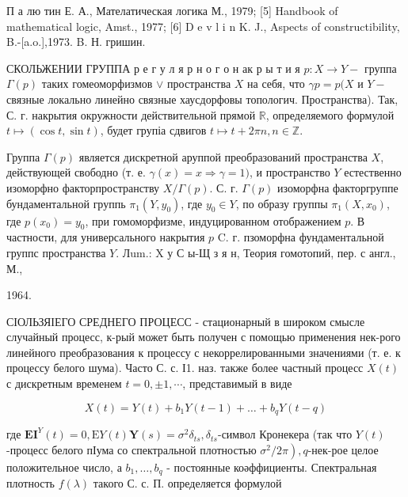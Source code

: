 \documentclass[10pt]{article}
\begin{document}
П а лю тин Е. А., Мателатическая логика М., 1979; [5] Handbook of mathematical logic, Amst., 1977; [6] D e v l i n K. J., Aspects of constructibility, B.-[a.o.],1973. B. Н. гришин.



СКОЛЬЖЕНИИ ГРУППА р е г у л я р н о г о н ак р ы т и я $p: X \rightarrow Y-$ группа $\Gamma(p)$ таких гомеоморфизмов $\vee$ пространства $X$ на себя, что $\gamma p=p(X$ и $Y-$ связные локально линейно связные хаусдорфовы топологич. Пространства). Так, С. г. накрытия окружности действительной прямой $\mathbb{R}$, определяемого формулой $t \mapsto(\cos t, \sin t)$, будет групіа сдвигов $t \mapsto t+2 \pi n, n \in \mathbb{Z}$.



Группа $\Gamma(p)$ является дискретной аруппой преобразований пространства $X$, действующей свободно (т. е. $\gamma(x)=x \Rightarrow \gamma=1)$, и пространство $Y$ естественно изоморфно факторпространству $X / \Gamma(p)$. С. г. $\Gamma(p)$ изоморфна факторгруппе бундаментальной группь $\pi_{1}\left(Y, y_{0}\right)$, где $y_{0} \in Y$, по образу группы $\pi_{1}\left(X, x_{0}\right)$, где $p\left(x_{0}\right)=y_{0}$, при гомоморфизме, индуцированном отображением $p$. В частности, для универсального накрытия $p$ C. г. пзоморфна фундаментальной группс пространства $Y$. Лum.: X у С ы-Щ з я н, Теория гомотопий, пер. с англ., М.,

1964.



СІОЛЬЗЯІЕГО СРЕДНЕГО ПРОЦЕСС - стационарный в широком смысле случайный процесс, к-рый может быть получен с помощью применения нек-рого линейного преобразования к процессу с некоррелированными значениями (т. е. к процессу белого шума). Часто С. с. І1. наз. также более частный процесс $X(t)$ с дискретным временем $t=0, \pm 1, \cdots$, представимый в виде



\[

X(t)=Y(t)+b_{1} Y(t-1)+\ldots+b_{q} Y(t-q)

\]



где $\boldsymbol{E I}^{Y}(t)=0, \mathrm{E} Y(t) \boldsymbol{Y}(s)=\sigma^{2} \delta_{t s}, \delta_{t s}$-символ Кронекера (так что $Y(t)$-процесс белого пІума со спектральной плотностью $\left.\sigma^{2} / 2 \pi\right), q$-нек-рое целое положительное число, а $b_{1}, \ldots, b_{q}$ - постоянные коәффициенты. Спектральная плотность $f(\lambda)$ такого С. с. П. определяется формулой
\end{document}
